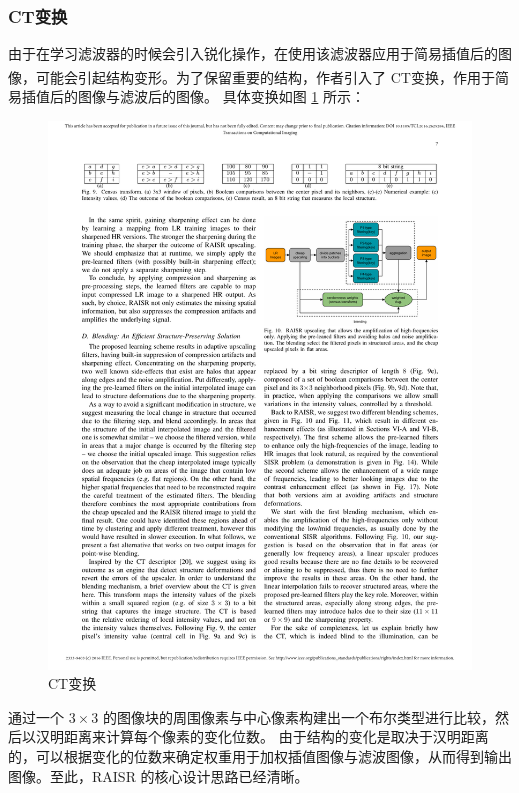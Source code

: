 \documentclass[12pt, a4paper, oneside]{ctexbook}
\begin{document}
	\subsubsection{CT变换}
	由于在学习滤波器的时候会引入锐化操作，在使用该滤波器应用于简易插值后的图像，可能会引起结构变形。为了保留重要的结构，作者引入了 CT变换\textsuperscript{\cite{7}}，作用于简易插值后的图像与滤波后的图像。
	具体变换如图 \ref{CT_tran} 所示：
	\begin{figure}[h]
		\centering
		\includegraphics[scale=0.88]{./pic/CT.pdf}
		\caption{CT变换}
		\label{CT_tran}
	\end{figure}
	通过一个 $3\times 3$ 的图像块的周围像素与中心像素构建出一个布尔类型进行比较，然后以汉明距离来计算每个像素的变化位数。
	由于结构的变化是取决于汉明距离的，可以根据变化的位数来确定权重用于加权插值图像与滤波图像，从而得到输出图像。至此，RAISR 的核心设计思路已经清晰。
	
\end{document}
